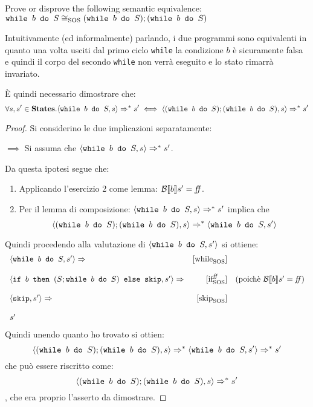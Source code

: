 {Prove or disprove the following semantic equivalence: \vspace{.7em} \\
$\wbS{b}{S} \eqSOS (\wbS{b}{S}); (\wbS{b}{S})$
}
{

Intuitivamente (ed informalmente) parlando, i due programmi sono equivalenti in
quanto una volta usciti dal primo ciclo \texttt{while} la condizione $b$ è
sicuramente falsa e quindi il corpo del secondo \texttt{while} non verrà
eseguito e lo stato rimarrà invariato.
\vspace{10pt}



È quindi necessario dimostrare che:
$$
\forall s,s' \in \states.
	\confSs{\wbS{b}{S}}{s} \Rar{*} s'
	\iff
	\confSs{(\wbS{b}{S}); (\wbS{b}{S})}{s} \Rar{*} s'
$$
\begin{proof} Si considerino le due implicazioni separatamente:

\vspace{10pt}
$\boxed{\implies}$
Si assuma che $\confSs{\wbS{b}{S}}{s} \Rar{*} s'$.

Da questa ipotesi segue che:
\begin{enumerate}
 \item Applicando l'esercizio 2 come lemma: $\B{b}' = \semfalse$. 
 \item Per il lemma di composizione: $\confSs{\wbS{b}{S}}{s} \Rar{*} s'$
 implica che
 $$\confSs{(\wbS{b}{S}); (\wbS{b}{S})}{s} \Rar{*} \confSs{\wbS{b}{S}}{s'}$$
\end{enumerate}
Quindi procedendo alla valutazione di $\confSs{\wbS{b}{S}}{s'}$ si ottiene:
$$
\begin{array}{lrr}
\confSs{\wbS{b}{S}}{s'} \Rar{} & \whileSOS & \\
& &\\
\confSs{\ifABC{b}{(S; \wbS{b}{S})}{\skipForFriends}}{s'} \Rar{} & \ifffSOS & (\text{poichè }\B{b}' = \semfalse)\\
& &\\
\confSs{\skipForFriends}{s'} \Rar{} & \skipSOS\\
& &\\
s' &\\
\end{array}
$$
Quindi unendo quanto ho trovato si ottien:
$$
\confSs{(\wbS{b}{S}); (\wbS{b}{S})}{s} \Rar{*} \confSs{\wbS{b}{S}}{s'} \Rar{*} s'
$$
che può essere riscritto come:
$$\confSs{(\wbS{b}{S}); (\wbS{b}{S})}{s} \Rar{*} s'$$
, che era proprio l'asserto da dimostrare.
\vspace{10pt}



\end{proof}}
